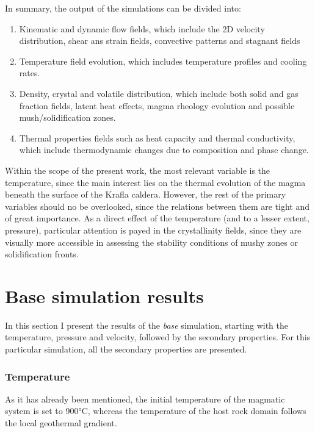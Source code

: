 In summary, the output of the simulations can be divided into: 
\begin{enumerate} 
\item Kinematic and dynamic flow fields, which include the 2D velocity distribution, shear ans strain fields, convective patterns and stagnant fields
\item Temperature field evolution, which includes temperature profiles and cooling rates.
\item Density, crystal and volatile distribution, which include both solid and gas fraction fields, latent heat effects, magma rheology evolution and possible mush/solidification zones.
\item Thermal properties fields such as heat capacity and thermal conductivity, which include thermodynamic changes due to composition and phase change. 
\end{enumerate}

Within the scope of the present work, the most relevant variable is the temperature, since the main interest lies on the thermal evolution of the magma beneath the surface of the Krafla caldera. However, the rest of the primary variables should no be overlooked, since the relations between them are tight and of great importance. As a direct effect of the temperature (and to a lesser extent, pressure), particular attention is payed in the crystallinity fields, since they are visually more accessible in assessing the stability conditions of mushy zones or solidification fronts.

\section{Base simulation results}
In this section I present the results of the \textit{base} simulation, starting with the temperature, pressure and velocity, followed by the secondary properties. For this particular simulation, all the secondary properties are presented.
\subsubsection{Temperature}
As it has already been mentioned, the initial temperature of the magmatic system is set to 900°C, whereas the temperature of the host rock domain follows the local geothermal gradient. 
